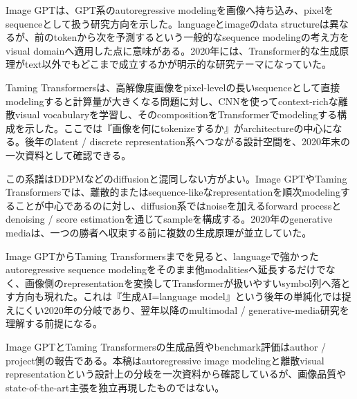 
Image GPTは、GPT系のautoregressive modelingを画像へ持ち込み、pixelをsequenceとして扱う研究方向を示した。languageとimageのdata structureは異なるが、前のtokenから次を予測するという一般的なsequence modelingの考え方をvisual domainへ適用した点に意味がある。2020年には、Transformer的な生成原理がtext以外でもどこまで成立するかが明示的な研究テーマになっていた。\autocite{src-d46ff01d5c8d}


Taming Transformersは、高解像度画像をpixel-levelの長いsequenceとして直接modelingすると計算量が大きくなる問題に対し、CNNを使ってcontext-richな離散visual vocabularyを学習し、そのcompositionをTransformerでmodelingする構成を示した。ここでは『画像を何にtokenizeするか』がarchitectureの中心になる。後年のlatent / discrete representation系へつながる設計空間を、2020年末の一次資料として確認できる。\autocite{src-03b656c5d291}


この系譜はDDPMなどのdiffusionと混同しない方がよい。Image GPTやTaming Transformersでは、離散的またはsequence-likeなrepresentationを順次modelingすることが中心であるのに対し、diffusion系ではnoiseを加えるforward processとdenoising / score estimationを通じてsampleを構成する。2020年のgenerative mediaは、一つの勝者へ収束する前に複数の生成原理が並立していた。\autocite{src-03b656c5d291,src-d46ff01d5c8d}


Image GPTからTaming Transformersまでを見ると、languageで強かったautoregressive sequence modelingをそのまま他modalitiesへ延長するだけでなく、画像側のrepresentationを変換してTransformerが扱いやすいsymbol列へ落とす方向も現れた。これは『生成AI=language model』という後年の単純化では捉えにくい2020年の分岐であり、翌年以降のmultimodal / generative-media研究を理解する前提になる。\autocite{src-03b656c5d291,src-d46ff01d5c8d}


\begin{claimboundary}
Image GPTとTaming Transformersの生成品質やbenchmark評価はauthor / project側の報告である。本稿はautoregressive image modelingと離散visual representationという設計上の分岐を一次資料から確認しているが、画像品質やstate-of-the-art主張を独立再現したものではない。\autocite{src-03b656c5d291,src-d46ff01d5c8d}
\end{claimboundary}
